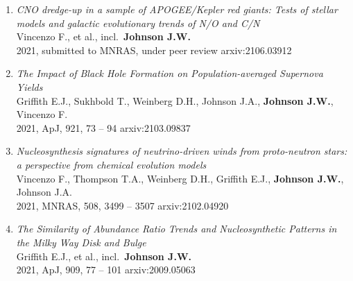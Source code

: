 \documentclass[cv.tex]{subfiles}
\begin{document}
\begin{enumerate}
	\item \textit{CNO dredge-up in a sample of APOGEE/Kepler red giants: Tests
	of stellar models and galactic evolutionary trends of N/O and C/N}
	\\
	Vincenzo F., et al., incl.~\textbf{Johnson J.W.}
	\\
	2021, submitted to MNRAS, under peer review \hfill arxiv:2106.03912

	\item \textit{The Impact of Black Hole Formation on Population-averaged
	Supernova Yields}
	\\
	Griffith E.J., Sukhbold T., Weinberg D.H., Johnson J.A.,
	\textbf{Johnson J.W.}, Vincenzo F.
	\\
	2021, ApJ, 921, 73 -- 94 \hfill arxiv:2103.09837

	\item \textit{Nucleosynthesis signatures of neutrino-driven winds from
	proto-neutron stars: a perspective from chemical evolution models}
	\\
	Vincenzo F., Thompson T.A., Weinberg D.H., Griffith E.J.,
	\textbf{Johnson J.W.}, Johnson J.A.
	\\
	2021, MNRAS, 508, 3499 -- 3507 \hfill arxiv:2102.04920

	\item \textit{The Similarity of Abundance Ratio Trends and Nucleosynthetic
	Patterns in the Milky Way Disk and Bulge}
	\\
	Griffith E.J., et al., incl.~\textbf{Johnson J.W.}
	\\
	2021, ApJ, 909, 77 -- 101 \hfill arxiv:2009.05063

\end{enumerate}
\end{document}
